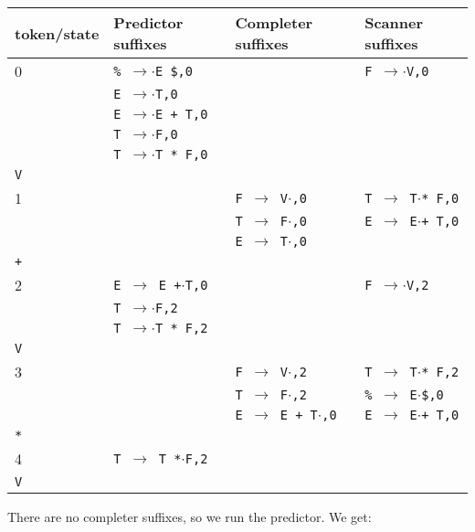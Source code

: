 \documentclass[11pt]{article}
\def\ra{\rightarrow}
\begin{document}
\begin{tabular}{|l|l|l|l|}
\hline
token/state & Predictor suffixes & Completer suffixes & Scanner suffixes\\
\hline
0     & \texttt{\% $\ra$$\cdot$E \$,0} & & \texttt{F $\ra$$\cdot$V,0}\\
      & \texttt{E $\ra$$\cdot$T,0} & & \\
      & \texttt{E $\ra$$\cdot$E + T,0} & & \\
      & \texttt{T $\ra$$\cdot$F,0} & & \\
      & \texttt{T $\ra$$\cdot$T * F,0} & & \\
\hline
\texttt{V} &  & &\\
\hline
1     &  & \texttt{F $\ra$ V$\cdot$,0}& \texttt{T $\ra$ T$\cdot$* F,0} \\
      &  & \texttt{T $\ra$ F$\cdot$,0}& \texttt{E $\ra$ E$\cdot$+ T,0} \\
      &  & \texttt{E $\ra$ T$\cdot$,0}& \\
\hline
\texttt{+} &  & &\\
\hline
2     & \texttt{E $\ra$ E +$\cdot$T,0} & & \texttt{F $\ra$$\cdot$V,2}\\
      & \texttt{T $\ra$$\cdot$F,2} & & \\
      & \texttt{T $\ra$$\cdot$T * F,2} & & \\
\hline 
\texttt{V} & & &\\
\hline
3     &  &  \texttt{F $\ra$ V$\cdot$,2}& \texttt{T $\ra$ T$\cdot$* F,2}\\
      &  &  \texttt{T $\ra$ F$\cdot$,2}& \texttt{\% $\ra$ E$\cdot$\$,0}\\
      &  &  \texttt{E $\ra$ E + T$\cdot$,0}& \texttt{E $\ra$ E$\cdot$+ T,0}\\
\hline
\texttt{*} & & & \\
\hline
4     & \texttt{T $\ra$ T *$\cdot$F,2} & & \\
\hline
\texttt{V} &  & &\\
\hline
\end{tabular}

There are no completer suffixes, so we run the predictor.  We get:
\end{document}
